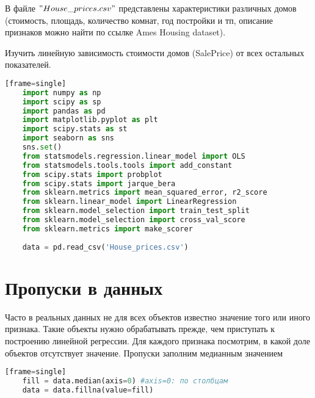 
\newpage
\begin{problem}
	В файле $ "House\_prices.csv"  $ представлены характеристики различных домов (стоимость, площадь, количество комнат, год постройки и тп, описание признаков можно найти по ссылке Ames Housing dataset).

	Изучить линейную зависимость стоимости домов (SalePrice) от всех остальных показателей.
\end{problem}
\begin{lstlisting}[language=Python][frame=single]
	import numpy as np
	import scipy as sp
	import pandas as pd
	import matplotlib.pyplot as plt
	import scipy.stats as st
	import seaborn as sns
	sns.set()
	from statsmodels.regression.linear_model import OLS
	from statsmodels.tools.tools import add_constant
	from scipy.stats import probplot
	from scipy.stats import jarque_bera
	from sklearn.metrics import mean_squared_error, r2_score
	from sklearn.linear_model import LinearRegression
	from sklearn.model_selection import train_test_split
	from sklearn.model_selection import cross_val_score
	from sklearn.metrics import make_scorer
	
	data = pd.read_csv('House_prices.csv')
\end{lstlisting}

\section{Пропуски в данных}\label{cha:linreg2/sec:propuski}

	Часто в реальных данных не для всех объектов известно значение того или иного признака. Такие объекты нужно обрабатывать прежде, чем приступать к построению линейной регрессии. Для каждого признака посмотрим, в какой доле объектов отсутствует значение. Пропуски заполним медианным значением
	
\begin{lstlisting}[language=Python][frame=single]
	fill = data.median(axis=0) #axis=0: по столбцам
	data = data.fillna(value=fill)
\end{lstlisting}

